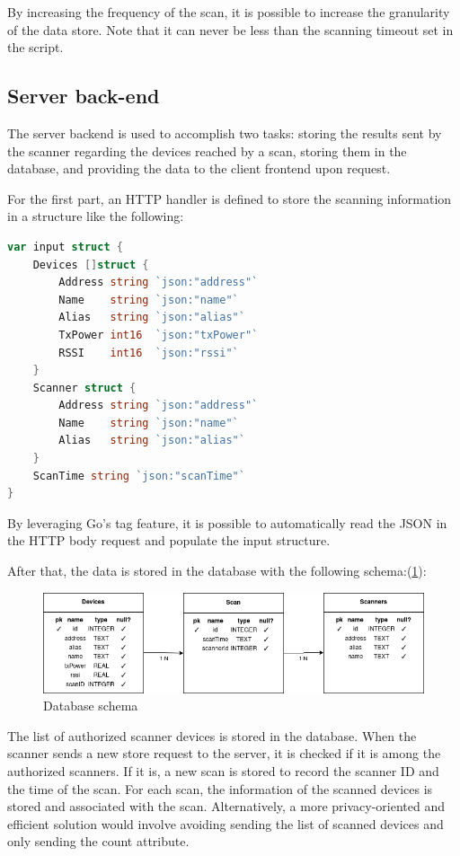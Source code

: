 \documentclass[a4paper, 11pt]{article}
\begin{document}
By increasing the frequency of the scan, it is possible to increase the granularity of the data store. Note that it can never be less than the scanning timeout set in the script.

\subsection{Server back-end}
The server backend is used to accomplish two tasks: storing the results sent by the scanner regarding the devices reached by a scan, storing them in the database, and providing the data to the client frontend upon request.

For the first part, an HTTP handler is defined to store the scanning information in a structure like the following:

\begin{lstlisting}[language=Go]
var input struct {
	Devices []struct {
		Address string `json:"address"`
		Name    string `json:"name"`
		Alias   string `json:"alias"`
		TxPower int16  `json:"txPower"`
		RSSI    int16  `json:"rssi"`
	}
	Scanner struct {
		Address string `json:"address"`
		Name    string `json:"name"`
		Alias   string `json:"alias"`
	}
	ScanTime string `json:"scanTime"`
}
\end{lstlisting}

By leveraging Go's tag feature, it is possible to automatically read the JSON in the HTTP body request and populate the input structure.

After that, the data is stored in the database with the following schema:(\ref{fig:database-schema}):

\begin{figure}
    \centering
    \includegraphics[width=1\linewidth]{images/WNMA_DB.drawio}
    \caption{Database schema}
    \label{fig:database-schema}
\end{figure}

The list of authorized scanner devices is stored in the database. When the scanner sends a new store request to the server, it is checked if it is among the authorized scanners. If it is, a new scan is stored to record the scanner ID and the time of the scan. For each scan, the information of the scanned devices is stored and associated with the scan. Alternatively, a more privacy-oriented and efficient solution would involve avoiding sending the list of scanned devices and only sending the count attribute.
\end{document}
